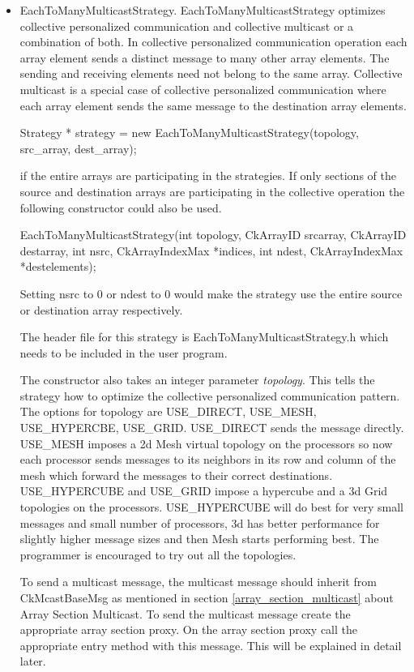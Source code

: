\begin{itemize} 

\item EachToManyMulticastStrategy. EachToManyMulticastStrategy optimizes 
collective personalized communication and collective multicast or a
combination of both. In collective personalized communication
operation each array element sends a distinct message to many other
array elements. The sending and receiving elements need not belong to
the same array.  Collective multicast is a special case of collective
personalized communication where each array element sends the same
message to the destination array elements.

Strategy * strategy = new EachToManyMulticastStrategy(topology,
src\_array, dest\_array);

if the entire arrays are participating in the strategies. If only
sections of the source and destination arrays are participating in the
collective operation the following constructor could also be used.

EachToManyMulticastStrategy(int topology, CkArrayID srcarray, CkArrayID destarray,
int nsrc, 
CkArrayIndexMax *indices, int ndest, 
CkArrayIndexMax  *destelements);

Setting nsrc to 0 or ndest to 0 would make the strategy use the entire
source or destination array respectively.

The header file for this strategy is EachToManyMulticastStrategy.h
which needs to be included in the user program.

The constructor also takes an integer parameter {\em topology}. This
tells the strategy how to optimize the collective personalized
communication pattern. The options for topology are USE\_DIRECT,
USE\_MESH, USE\_HYPERCBE, USE\_GRID. USE\_DIRECT sends the message
directly. USE\_MESH imposes a 2d Mesh virtual topology on the
processors so now each processor sends messages to its neighbors in
its row and column of the mesh which forward the messages to their
correct destinations. USE\_HYPERCUBE and USE\_GRID impose a hypercube
and a 3d Grid topologies on the processors. USE\_HYPERCUBE will do
best for very small messages and small number of processors, 3d has
better performance for slightly higher message sizes and then Mesh
starts performing best. The programmer is encouraged to try out all
the topologies.

To send a multicast message, the multicast message should inherit from
CkMcastBaseMsg as mentioned in section \ref{array_section_multicast}
about Array Section Multicast. To send the multicast message create
the appropriate array section proxy. On the array section proxy call
the appropriate entry method with this message. This will be explained
in detail later.


\end{itemize}
